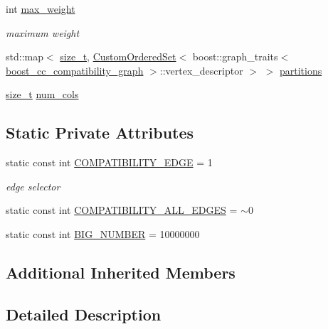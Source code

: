 \begin{DoxyCompactItemize}
int \hyperlink{classbipartite__matching__clique__covering_a2e4f0f5eabc59b1bb5aa3ce3eca0b8f9}{max\+\_\+weight}
\begin{DoxyCompactList}\small\item\em maximum weight \end{DoxyCompactList}\item 
std\+::map$<$ \hyperlink{tutorial__fpt__2017_2intro_2sixth_2test_8c_a7c94ea6f8948649f8d181ae55911eeaf}{size\+\_\+t}, \hyperlink{classCustomOrderedSet}{Custom\+Ordered\+Set}$<$ boost\+::graph\+\_\+traits$<$ \hyperlink{clique__covering__graph_8hpp_af47b1c28cf9a2c360afafb8d80582ce6}{boost\+\_\+cc\+\_\+compatibility\+\_\+graph} $>$\+::vertex\+\_\+descriptor $>$ $>$ \hyperlink{classbipartite__matching__clique__covering_a9d06b88dae787e1e26a95783ac0999cb}{partitions}
\item 
\hyperlink{tutorial__fpt__2017_2intro_2sixth_2test_8c_a7c94ea6f8948649f8d181ae55911eeaf}{size\+\_\+t} \hyperlink{classbipartite__matching__clique__covering_a8b9b5e4093ca3e406f86871dc565faf6}{num\+\_\+cols}
\end{DoxyCompactItemize}
\subsection*{Static Private Attributes}
\begin{DoxyCompactItemize}
\item 
static const int \hyperlink{classbipartite__matching__clique__covering_ab0a5fea2400801eee7ad8ce5e3635d4d}{C\+O\+M\+P\+A\+T\+I\+B\+I\+L\+I\+T\+Y\+\_\+\+E\+D\+GE} = 1
\begin{DoxyCompactList}\small\item\em edge selector \end{DoxyCompactList}\item 
static const int \hyperlink{classbipartite__matching__clique__covering_a322509b5c65751bf3d8122c1e81e8c10}{C\+O\+M\+P\+A\+T\+I\+B\+I\+L\+I\+T\+Y\+\_\+\+A\+L\+L\+\_\+\+E\+D\+G\+ES} = $\sim$0
\item 
static const int \hyperlink{classbipartite__matching__clique__covering_aa0dfe6145678c058eb4cfadb051f6a0b}{B\+I\+G\+\_\+\+N\+U\+M\+B\+ER} = 10000000
\end{DoxyCompactItemize}
\subsection*{Additional Inherited Members}


\subsection{Detailed Description}
